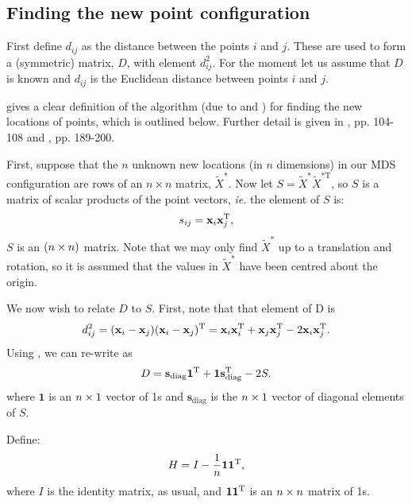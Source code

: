 \subsection{Finding the new point configuration}

First define $d_{ij}$ as the distance between the points $i$ and $j$. These are used to form a (symmetric) matrix, $D$, with \ijth element $d^2_{ij}$. For the moment let us assume that $D$ is known and $d_{ij}$ is the Euclidean distance between points $i$ and $j$. 

\cite{diaconis08} gives a clear definition of the algorithm (due to \cite{schoenberg35} and \cite{torgerson}) for finding the new locations of points, which is outlined below. Further detail is given in \cite{principlesofMA}, pp. 104-108 and \cite{chatfieldcollins}, pp. 189-200.

First, suppose that the $n$ unknown new locations (in $n$ dimensions) in our MDS configuration are rows of an $n \times n$ matrix, $\tilde{X}^*$. Now let $S=\tilde{X}^{*} \tilde{X}^{*\text{T}} $, so $S$ is a matrix of scalar products of the point vectors, \emph{ie.} the \ijth element of $S$ is:
\begin{equation}
s_{ij} = \mathbf{x}_i\mathbf{x}_j^{\text{T}},
\label{selem}
\end{equation}
$S$ is an $(n\times n)$ matrix. Note that we may only find $\tilde{X}^*$ up to a translation and rotation, so it is assumed that the values in $\tilde{X}^*$ have been centred about the origin.

We now wish to relate $D$ to $S$. First, note that that \ijth element of D is 
\begin{equation}
d_{ij}^2 = (\mathbf{x}_i-\mathbf{x}_j)(\mathbf{x}_i-\mathbf{x}_j)^{\text{T}} = \mathbf{x}_i\mathbf{x}_i^{\text{T}} + \mathbf{x}_j\mathbf{x}_j^{\text{T}}  -2 \mathbf{x}_i\mathbf{x}_j^{\text{T}}.
\label{dij}
\end{equation}
Using , we can re-write  as
\begin{equation}
D=\mathbf{s}_\text{diag}\mathbf{1}^{\text{T}} + \mathbf{1}\mathbf{s}_\text{diag}^{\text{T}} -2S.
\label{dijmat}
\end{equation}
where $\mathbf{1}$ is an $n \times 1$ vector of 1s and $\mathbf{s}_\text{diag}$ is the $n \times 1$ vector of diagonal elements of $S$.

Define:
\begin{equation}
H = I-\frac{1}{n}\mathbf{1}\mathbf{1}^{\text{T}},
\end{equation}
where $I$ is the identity matrix, as usual, and $\mathbf{1}\mathbf{1}^{\text{T}}$ is an $n \times n$ matrix of 1s.

